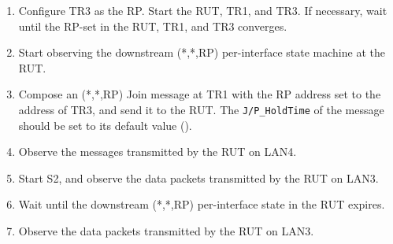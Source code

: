 \documentclass[11pt]{report}
\begin{document}

\begin{enumerate}

  \item Configure TR3 as the RP. Start the RUT, TR1, and TR3. If
  necessary, wait until the RP-set in the RUT, TR1, and TR3
  converges.

  \item Start observing the downstream (*,*,RP) per-interface state
  machine at the RUT.

  \item Compose an (*,*,RP) Join message at TR1 with the RP address set
  to the address of TR3, and send it to the RUT.
  The \verb=J/P_HoldTime= of the message should be set to its default
  value ({\PimsmJPHoldTime}).

  \item Observe the messages transmitted by the RUT on LAN4.

  \item Start S2, and observe the data packets transmitted by the RUT on
  LAN3.

  \item Wait until the downstream (*,*,RP) per-interface state in the RUT
  expires.

  \item Observe the data packets transmitted by the RUT on LAN3.

\end{enumerate}

\end{document}
